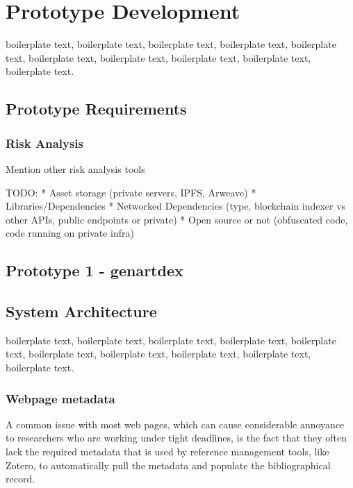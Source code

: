 \chapter{Prototype Development}


boilerplate text, boilerplate text, boilerplate text, boilerplate text, boilerplate text, boilerplate text, boilerplate text, boilerplate text, boilerplate text, boilerplate text.


\section {Prototype Requirements}

\subsection{Risk Analysis}

Mention other risk analysis tools \cite{l2beatL2BEATStateLayer2024}

TODO:
* Asset storage (private servers, IPFS, Arweave)
* Libraries/Dependencies
* Networked Dependencies (type, blockchain indexer vs other APIs, public endpoints or private)
* Open source or not (obfuscated code, code running on private infra)




\section {Prototype 1 - genartdex}

\section{System Architecture}

boilerplate text, boilerplate text, boilerplate text, boilerplate text, boilerplate text, boilerplate text, boilerplate text, boilerplate text, boilerplate text, boilerplate text.


\subsection{Webpage metadata}

A common issue with most web pages, which can cause considerable annoyance to researchers who are working under tight deadlines, is the fact that they often lack the required metadata that is used by reference management tools, like Zotero, to automatically pull the metadata and populate the bibliographical record.

